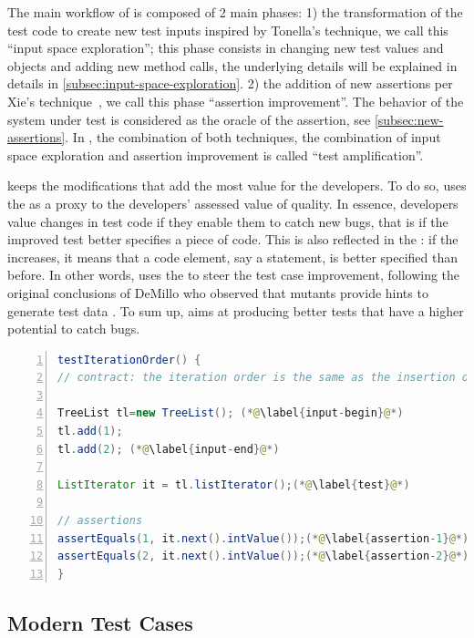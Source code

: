 The main workflow of \dspot{} is composed of 2 main phases:
1) the transformation of the test code to create new test inputs inspired by Tonella's technique, we call this ``input space exploration''; this phase consists in changing new test values and objects and adding new method calls, the underlying details will be explained in details in \autoref{subsec:input-space-exploration}.
2) the addition of new assertions per Xie's technique~\cite{TaoXie2006}, we call this phase ``assertion improvement''. The behavior of the system under test is considered as the oracle of the assertion, see \autoref{subsec:new-assertions}.
In \dspot, the combination of both techniques, \ie the combination of input space exploration and assertion improvement is called ``test amplification''.

\dspot keeps the modifications that add the most value for the developers.
To do so, \dspot uses the \ms as a proxy to the developers' assessed value of quality.
In essence, developers value changes in test code if they enable them to catch new bugs, that is if the improved test better specifies a piece of code.
This is also reflected in the \ms: if the \ms increases, it means that a code element, say a statement, is better specified than before. 
In other words, \dspot uses the \ms to steer the test case improvement, following the original conclusions of DeMillo \etal who observed that mutants provide hints to generate test data \cite{demillo1978hints}.
To sum up, \dspot aims at producing better tests that have a higher potential to catch bugs.

\begin{lstlisting}[caption={An example of an object-oriented test case  (inspired from Apache Commons Collections)},label=lst:archetype,float,language=java,numbers=left] 
testIterationOrder() {
// contract: the iteration order is the same as the insertion order

TreeList tl=new TreeList(); (*@\label{input-begin}@*)
tl.add(1);
tl.add(2); (*@\label{input-end}@*)

ListIterator it = tl.listIterator();(*@\label{test}@*)

// assertions
assertEquals(1, it.next().intValue());(*@\label{assertion-1}@*)
assertEquals(2, it.next().intValue());(*@\label{assertion-2}@*)
}
\end{lstlisting}

\subsection{Modern Test Cases}
\label{subsec:test-case-explanation}

